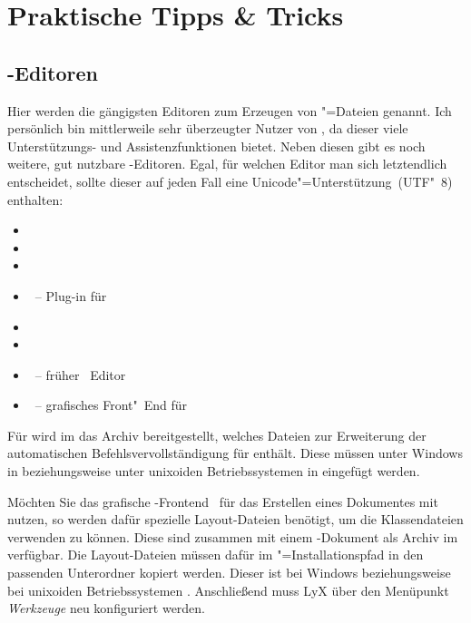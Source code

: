 \newcommand*\TaT{\hyperref[sec:tips]{Tipps \& Tricks}}
\chapter{Praktische Tipps \& Tricks}
%
\section{-Editoren}
\label{sec:tips:editor}
Hier werden die gängigsten Editoren zum Erzeugen von "=Dateien 
genannt. Ich persönlich bin mittlerweile sehr überzeugter Nutzer von 
, da dieser viele Unterstützungs- und 
Assistenzfunktionen bietet. Neben diesen gibt es noch weitere, gut nutzbare 
-Editoren. Egal, für welchen Editor man sich letztendlich 
entscheidet, sollte dieser auf jeden Fall eine Unicode"=Unterstützung~(UTF"~8) 
enthalten:
%
\begin{itemize}
\item {}
\item {}
\item {}
\item {}~-- Plug-in für 
\item {}
\item {}
\item {}~-- früher ~Editor
\item {}~-- grafisches Front"~End für 
\end{itemize}
%
Für  wird im \GitHubRepo* das Archiv 
%
{} bereitgestellt, welches Dateien zur Erweiterung 
der automatischen Befehlsvervollständigung für \TUDScript enthält. Diese müssen 
unter Windows in  beziehungsweise 
unter unixoiden Betriebssystemen in  eingefügt werden.

Möchten Sie das grafische -Frontend~ 
für das Erstellen eines Dokumentes mit \TUDScript nutzen, so werden dafür 
spezielle Layout-Dateien benötigt, um die Klassendateien verwenden zu können. 
Diese sind zusammen mit einem -Dokument als Archiv 
%
{} im \GitHubRepo* verfügbar. Die Layout-Dateien müssen 
dafür im "=Installationspfad in den passenden 
Unterordner kopiert werden. Dieser ist bei Windows
beziehungsweise bei unixoiden Betriebssystemen .
Anschließend muss LyX über den Menüpunkt \emph{Werkzeuge} neu konfiguriert 
werden. 



